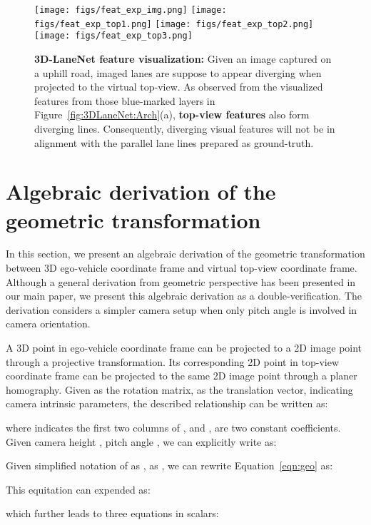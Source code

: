 \documentclass[10pt,twocolumn,letterpaper]{article}
\begin{document}
\begin{figure}[!h]
  \centering
\texttt{[image: figs/feat\_exp\_img.png]}
  \texttt{[image: figs/feat\_exp\_top1.png]}
  \texttt{[image: figs/feat\_exp\_top2.png]}
  \texttt{[image: figs/feat\_exp\_top3.png]}
\caption{\textbf{3D-LaneNet feature visualization:} Given an image captured on a uphill road, imaged lanes are suppose to appear diverging when projected to the virtual top-view. As observed from the visualized features from those blue-marked layers in Figure~\ref{fig:3DLaneNet:Arch}(a), \textbf{top-view features} also form diverging lines. Consequently, diverging visual features will not be in alignment with the parallel lane lines prepared as ground-truth.}
  \label{fig:feat:vis}
\end{figure}



\section{Algebraic derivation of the geometric transformation}
\label{sec:geo:derive}

In this section, we present an algebraic derivation of the geometric transformation between 3D ego-vehicle coordinate frame and virtual top-view coordinate frame. Although a general derivation from geometric perspective has been presented in our main paper, we present this algebraic derivation as a double-verification. The derivation considers a simpler camera setup when only pitch angle is involved in camera orientation.

A 3D point  in ego-vehicle coordinate frame can be projected to a 2D image point  through a projective transformation. Its corresponding 2D point  in top-view coordinate frame can be projected to the same 2D image point through a planer homography. Given  as the rotation matrix,  as the translation vector,  indicating camera intrinsic parameters, the described relationship can be written as: 
{\small

}
\noindent where  indicates the first two columns of , and ,  are two constant coefficients. Given camera height , pitch angle , we can explicitly write  as: 
{\small

}
\noindent Given simplified notation of  as ,   as , we can rewrite Equation~\ref{eqn:geo} as:
{\small

}
\noindent This equitation can expended as:
{\small

}
\noindent which further leads to three equations in scalars:
\end{document}
